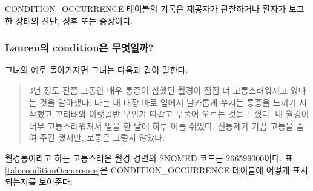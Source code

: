 \documentclass[11pt]{book}
\theoremstyle{definition}
\theoremstyle{definition}
\theoremstyle{definition}
\theoremstyle{remark}
\begin{document}
CONDITION\_OCCURRENCE 테이블의 기록은 제공자가 관찰하거나 환자가 보고한
상태의 진단, 징후 또는 증상이다.

\subsubsection*{Lauren의 condition은 무엇일까?}\label{lauren-condition-}

그녀의 예로 돌아가자면 그녀는 다음과 같이 말한다:

\begin{quote}
3년 정도 전쯤 그동안 매우 통증이 심했던 월경이 점점 더 고통스러워지고
있다는 것을 알아챘다. 나는 내 대장 바로 옆에서 날카롭게 쑤시는 통증을
느끼기 시작했고 꼬리뼈와 아랫골반 부위가 따갑고 부풀어 오르는 것을
느꼈다. 내 월경이 너무 고통스러워져서 일을 한 달에 하루 이틀 쉬었다.
진통제가 가끔 고통을 줄여 주긴 했지만, 보통은 그렇지 않았다.
\end{quote}

월경통이라고 하는 고통스러운 월경 경련의 SNOMED 코드는 266599000이다. 표
\ref{tab:conditionOccurrence}은 CONDITION\_OCCURRENCE 테이블에 어떻게
표시되는지를 보여준다:
\end{document}
